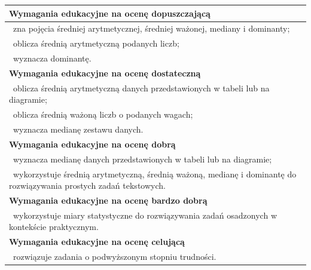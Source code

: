\documentclass[12pt,a4paper]{article}
\begin{document}
	\begin{longtable}{|p{16cm}|}
		\hline
		
		\textbf{Wymagania edukacyjne na ocenę dopuszczającą} \\ \hline
		
		\textbullet\ zna pojęcia średniej arytmetycznej, średniej ważonej, mediany i dominanty; \\
		
		\textbullet\ oblicza średnią arytmetyczną podanych liczb; \\
		
		\textbullet\ wyznacza dominantę. \\ \hline
		
		\textbf{Wymagania edukacyjne na ocenę dostateczną} \\ \hline
		
		\textbullet\ oblicza średnią arytmetyczną danych przedstawionych w tabeli lub na diagramie; \\
		
		\textbullet\ oblicza średnią ważoną liczb o podanych wagach; \\
		
		\textbullet\ wyznacza medianę zestawu danych. \\ \hline
		
		\textbf{Wymagania edukacyjne na ocenę dobrą} \\ \hline
		
		\textbullet\ wyznacza medianę danych przedstawionych w tabeli lub na diagramie; \\
		
		\textbullet\ wykorzystuje średnią arytmetyczną, średnią ważoną, medianę i dominantę do rozwiązywania prostych zadań tekstowych. \\ \hline
		
		\textbf{Wymagania edukacyjne na ocenę bardzo dobrą} \\ \hline
		
		\textbullet\ wykorzystuje miary statystyczne do rozwiązywania zadań osadzonych w kontekście praktycznym. \\ \hline
		
		\textbf{Wymagania edukacyjne na ocenę celującą} \\ \hline
		
		\textbullet\ rozwiązuje zadania o podwyższonym stopniu trudności. \\ \hline
		
	\end{longtable}
	
\end{document}
